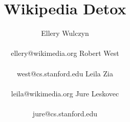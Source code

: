 \documentclass{sig-alternate-2013}
\newcommand{\cpt}[1]{\textsc{\MakeLowercase{#1}}}
\newcommand{\eg}{\textit{e.g.}}
\newcommand{\WP}{Wikipedia}
\begin{document}
%


\title{
Wikipedia Detox
}

\author{
\alignauthor
\hspace{-0.8cm}
Ellery Wulczyn \\
\hspace{-0.8cm}
       \\
\hspace{-0.8cm}
       ellery@wikimedia.org
\alignauthor
\hspace{-2cm}
Robert West \\
\hspace{-2cm}
       \\
\hspace{-2cm}
       west@cs.stanford.edu
\alignauthor
\hspace{-3.5cm}
Leila Zia \\
\hspace{-3.5cm}
       \\
\hspace{-3.5cm}
       leila@wikimedia.org
\alignauthor
\hspace{-5cm}
Jure Leskovec \\
\hspace{-5cm}
       \\
\hspace{-5cm}
        jure@cs.stanford.edu   
}

\maketitle




\end{document}
